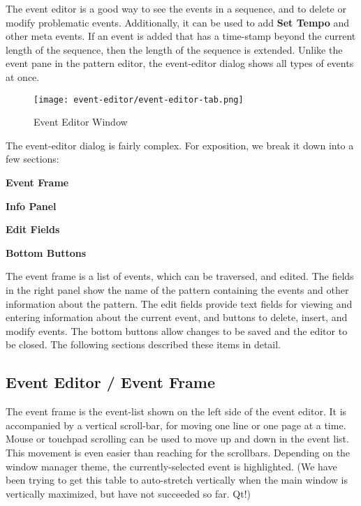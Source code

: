    The event editor is a good way to see the events in a sequence,
   and to delete or modify problematic events.
   Additionally, it can be used to add \textbf{Set Tempo} and other
   meta events.
   If an event is added that has a time-stamp beyond the current
   length of the sequence, then the length of the sequence is extended.
   Unlike the event pane in the pattern editor, the event-editor
   dialog shows all types of events at once.

\begin{figure}[H]
   \centering
   \texttt{[image: event-editor/event-editor-tab.png]}
   \caption{Event Editor Window}
   \label{fig:event_editor_window}
\end{figure}

   The event-editor dialog is fairly complex.
   For exposition, we break it down into a few sections:

   \begin{enumber}
      \item \textbf{Event Frame}
      \item \textbf{Info Panel}
      \item \textbf{Edit Fields}
      \item \textbf{Bottom Buttons}
   \end{enumber}

   The event frame is a list of events, which can be traversed, and edited.
   The fields in the right panel show the name of
   the pattern containing the events and other information about the
   pattern.  The edit fields provide text fields for viewing and entering
   information about the current event, and buttons to delete, insert, and
   modify events.  The bottom buttons allow changes to be saved and the editor
   to be closed.  
   The following sections described these items in detail.

\subsection{Event Editor / Event Frame}
\label{subsec:event_editor_frame}

   The event frame is the event-list shown on the left side of the
   event editor.  It is accompanied by a vertical scroll-bar, for moving one
   line or one page at a time.
   Mouse or touchpad scrolling can be used to move up and down
   in the event list.  This movement is even easier than reaching for the
   scrollbars.
   Depending on the window manager theme, the currently-selected event
   is highlighted.
   (We have been trying to get this table to auto-stretch vertically when the
   main window is vertically maximized, but have not succeeded so far. Qt!)

